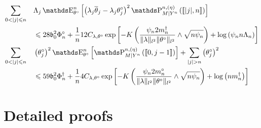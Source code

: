 \begin{pr}\label{PRD.4.2}
\begin{alignat}{2}
& \sum\limits_{0 < \vert j \vert \leq n} && \Lambda_{j} \E_{\theta^{\circ}}^{n}\left[\left(\lambda_{j} \overline{\theta}_{j} - \lambda_{j} \theta^{\circ}_{j}\right)^{2} \P_{M \vert Y^{n}}^{n, (\eta)}\left(\llbracket \vert j \vert, n \rrbracket\right)\right]\notag \\
& && \leq 28 \mathfrak{b}_{0}^{2} \Phi^{\circ}_{n} + \frac{1}{n} 12 C_{\lambda, \theta^{\circ}} \exp\left[- K \left(\frac{\psi_{n} 2 m^{\dagger}_{n}}{\Vert \lambda \Vert_{l^{2}} \Vert \theta^{\circ} \Vert_{l^{2}}} \wedge \sqrt{n \psi_{n}}\right) + \log\left(\psi_{n} n \Lambda_{n}\right)\right]\label{EQD.22}\\
& \sum\limits_{0 < \vert j \vert \leq n} && \left(\theta^{\circ}_{j}\right)^{2} \E_{\theta^{\circ}}^{n}\left[\P_{M \vert Y^{n}}^{n, (\eta)}\left(\llbracket 0, j-1 \rrbracket \right)\right] + \sum\limits_{ \vert j \vert > n} \left( \theta^{\circ}_{j}\right)^{2}\notag\\
& && \leq 59 \mathfrak{b}_{0}^{2} \Phi^{\dagger}_{n} + \frac{1}{n} 4 C_{\lambda, \theta^{\circ}} \exp\left[- K \left(\frac{\psi_{n} 2 m^{\circ}_{n}}{\Vert \lambda \Vert_{l^{2}} \Vert \theta^{\circ} \Vert_{l^{2}}} \wedge \sqrt{n \psi_{n}}\right) + \log\left(n m^{\dagger}_{n}\right)\right]\label{EQD.23}
\end{alignat}
\end{pr}

\section{Detailed proofs}

